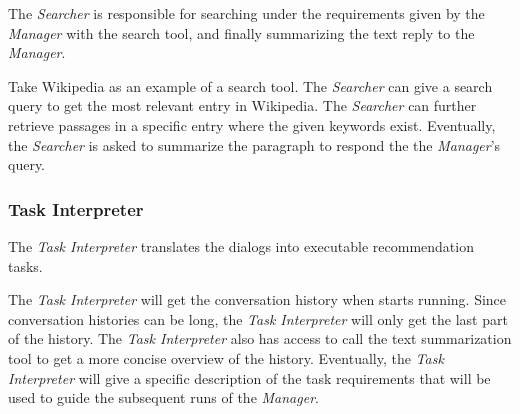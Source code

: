 The \textsl{Searcher} is responsible for searching under the requirements given by the \textsl{Manager} with the search tool, and finally summarizing the text reply to the \textsl{Manager}.

Take Wikipedia as an example of a search tool.
The \textsl{Searcher} can give a search query to get the most relevant entry in Wikipedia.
The \textsl{Searcher} can further retrieve passages in a specific entry where the given keywords exist.
Eventually, the \textsl{Searcher} is asked to summarize the paragraph to respond the the \textsl{Manager}'s query.

\subsubsection{\textbf{Task Interpreter}}
The \textsl{Task Interpreter} translates the dialogs into executable recommendation tasks.

The \textsl{Task Interpreter} will get the conversation history when starts running.
Since conversation histories can be long, the \textsl{Task Interpreter} will only get the last part of the history.
The \textsl{Task Interpreter} also has access to call the text summarization tool to get a more concise overview of the history.
Eventually, the \textsl{Task Interpreter} will give a specific description of the task requirements that will be used to guide the subsequent runs of the \textsl{Manager}.





